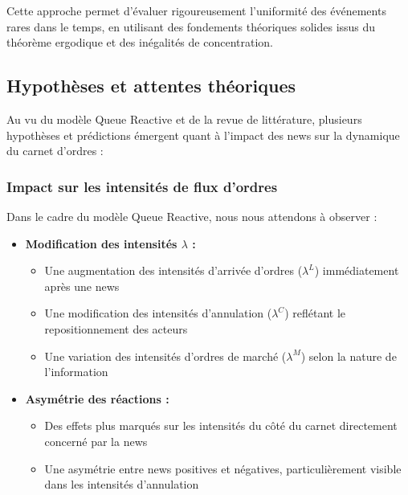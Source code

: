 \documentclass[12pt,a4paper]{article}
\theoremstyle{definition}
\theoremstyle{remark}
\begin{document}
Cette approche permet d'évaluer rigoureusement l'uniformité des événements rares dans le temps, en utilisant des fondements théoriques solides issus du théorème ergodique et des inégalités de concentration.










\newpage

    \subsection{Hypothèses et attentes théoriques}

    Au vu du modèle Queue Reactive et de la revue de littérature, plusieurs hypothèses et prédictions émergent quant à l'impact des news sur la dynamique du carnet d'ordres :

    \subsubsection{Impact sur les intensités de flux d'ordres}

    Dans le cadre du modèle Queue Reactive, nous nous attendons à observer :

    \begin{itemize}
        \item \textbf{Modification des intensités $\lambda$ :}
        \begin{itemize}
            \item Une augmentation des intensités d'arrivée d'ordres ($\lambda^L$) immédiatement après une news
            \item Une modification des intensités d'annulation ($\lambda^C$) reflétant le repositionnement des acteurs
            \item Une variation des intensités d'ordres de marché ($\lambda^M$) selon la nature de l'information
        \end{itemize}
        
        \item \textbf{Asymétrie des réactions :}
        \begin{itemize}
            \item Des effets plus marqués sur les intensités du côté du carnet directement concerné par la news
            \item Une asymétrie entre news positives et négatives, particulièrement visible dans les intensités d'annulation
        \end{itemize}
    \end{itemize}
\end{document}

